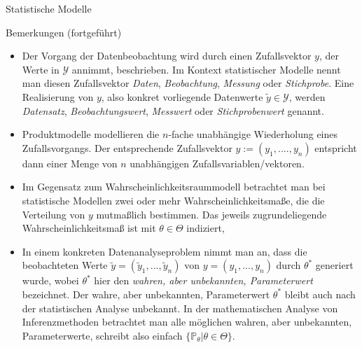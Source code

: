 \documentclass[
  8pt,
  ignorenonframetext,
]{beamer}
\begin{document}
\begin{frame}{Statistische Modelle}
\protect\hypertarget{statistische-modelle-1}{}
\footnotesize

Bemerkungen (fortgeführt)

\begin{itemize}
\item
  \justifying Der Vorgang der Datenbeobachtung wird durch einen
  Zufallsvektor \(y\), der Werte in \(\mathcal{Y}\) annimmt,
  beschrieben. Im Kontext statistischer Modelle nennt man diesen
  Zufallsvektor \emph{Daten}, \emph{Beobachtung}, \emph{Messung} oder
  \emph{Stichprobe}. Eine Realisierung von \(y\), also konkret
  vorliegende Datenwerte \(\tilde{y} \in \mathcal{Y}\), werden
  \emph{Datensatz}, \emph{Beobachtungswert}, \emph{Messwert} oder
  \emph{Stichprobenwert} genannt.
\item
  \justifying Produktmodelle modellieren die \(n\)-fache unabhängige
  Wiederholung eines Zufallsvorgangs. Der entsprechende Zufallsvektor
  \(y := (y_1,....,y_n)\) entspricht dann einer Menge von \(n\)
  unabhängigen Zufallsvariablen/vektoren.
\item
  \justifying Im Gegensatz zum Wahrscheinlichkeitsraummodell betrachtet
  man bei statistische Modellen zwei oder mehr Wahrscheinlichkeitsmaße,
  die die Verteilung von \(y\) mutmaßlich bestimmen. Das jeweils
  zugrundeliegende Wahrscheinlichkeitsmaß ist mit \(\theta \in \Theta\)
  indiziert,
\item
  \justifying In einem konkreten Datenanalyseproblem nimmt man an, dass
  die beobachteten Werte \(\tilde{y} = (\tilde{y}_1,...,\tilde{y}_n)\)
  von \(y = (y_1,...,y_n)\) durch \(\theta^*\) generiert wurde, wobei
  \(\theta^*\) hier den \emph{wahren, aber unbekannten, Parameterwert}
  bezeichnet. Der wahre, aber unbekannten, Parameterwert \(\theta^*\)
  bleibt auch nach der statistischen Analyse unbekannt. In der
  mathematischen Analyse von Inferenzmethoden betrachtet man alle
  möglichen wahren, aber unbekannten, Parameterwerte, schreibt also
  einfach \(\{\mathbb{P}_\theta |\theta \in \Theta\}\).
\end{itemize}
\end{frame}
\end{document}

